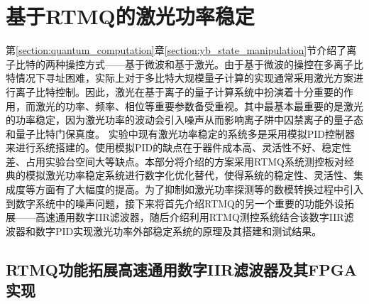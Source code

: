 \section[基于RTMQ的激光功率稳定]{基于RTMQ的激光功率稳定\label{section:laser_power_locking}}
第\ref{section:quantum_computation}章\ref{section:yb_state_manipulation}节介绍了离子比特的两种操控方式——基于微波和基于激光。由于基于微波的操控在多离子比特情况下寻址困难，实际上对于多比特大规模量子计算的实现通常采用激光方案进行离子比特控制。因此，激光在基于离子的量子计算系统中扮演着十分重要的作用，而激光的功率、频率、相位等重要参数备受重视。其中最基本最重要的是激光的功率稳定，因为激光功率的波动会引入噪声从而影响离子阱中囚禁离子的量子态和量子比特门保真度\cite[]{Blums_Scarabel_Shimizu_Ghadimi_Connell_Händel_Norton_Bridge_Kielpinski_Lobino_et_al_2020}。
实验中现有激光功率稳定的系统多是采用模拟PID控制器来进行系统搭建的。使用模拟PID的缺点在于器件成本高、灵活性不好、稳定性差、占用实验台空间大等缺点。本部分将介绍的方案采用RTMQ系统测控板对经典的模拟激光功率稳定系统进行数字化优化替代，使得系统的稳定性、灵活性、集成度等方面有了大幅度的提高。为了抑制如激光功率探测等的数模转换过程中引入到数字系统中的噪声问题，接下来将首先介绍RTMQ的另一个重要的功能外设拓展——高速通用数字IIR滤波器，随后介绍利用RTMQ测控系统结合该数字IIR滤波器和数字PID实现激光功率外部稳定系统的原理及其搭建和测试结果。

\subsection[RTMQ功能拓展高速通用数字IIR滤波器及其FPGA实现]{RTMQ功能拓展高速通用数字IIR滤波器及其FPGA实现\label{section:digital_iir}}


